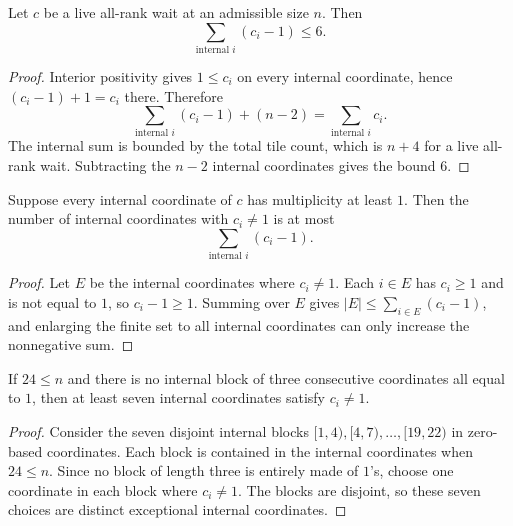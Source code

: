 \begin{lemma}

  \label{lem:internal_excess_le_six}
  Let \(c\) be a live all-rank wait at an admissible size \(n\).  Then
  \[
    \sum_{\text{internal }i}(c_i-1)\leq6.
  \]
\end{lemma}
\begin{proof}

\leanok
  Interior positivity gives \(1\leq c_i\) on every internal coordinate, hence
  \((c_i-1)+1=c_i\) there.  Therefore
  \[
    \sum_{\text{internal }i}(c_i-1)+(n-2)
      =\sum_{\text{internal }i}c_i.
  \]
  The internal sum is bounded by the total tile count, which is \(n+4\) for a
  live all-rank wait.  Subtracting the \(n-2\) internal coordinates gives the
  bound \(6\).
\end{proof}

\begin{lemma}

  \label{lem:exception_card_le_internal_excess}
  Suppose every internal coordinate of \(c\) has multiplicity at least \(1\).
  Then the number of internal coordinates with \(c_i\ne1\) is at most
  \[
    \sum_{\text{internal }i}(c_i-1).
  \]
\end{lemma}
\begin{proof}

\leanok
  Let \(E\) be the internal coordinates where \(c_i\ne1\).  Each \(i\in E\)
  has \(c_i\geq1\) and is not equal to \(1\), so \(c_i-1\geq1\).  Summing over
  \(E\) gives \(|E|\leq\sum_{i\in E}(c_i-1)\), and enlarging the finite set to
  all internal coordinates can only increase the nonnegative sum.
\end{proof}

\begin{lemma}

  \label{lem:seven_le_exception_card_of_no_three}
  If \(24\leq n\) and there is no internal block of three consecutive
  coordinates all equal to \(1\), then at least seven internal coordinates
  satisfy \(c_i\ne1\).
\end{lemma}
\begin{proof}

\leanok
  Consider the seven disjoint internal blocks
  \([1,4),[4,7),\ldots,[19,22)\) in zero-based coordinates.  Each block is
  contained in the internal coordinates when \(24\leq n\).  Since no block of
  length three is entirely made of \(1\)'s, choose one coordinate in each block
  where \(c_i\ne1\).  The blocks are disjoint, so these seven choices are
  distinct exceptional internal coordinates.
\end{proof}

